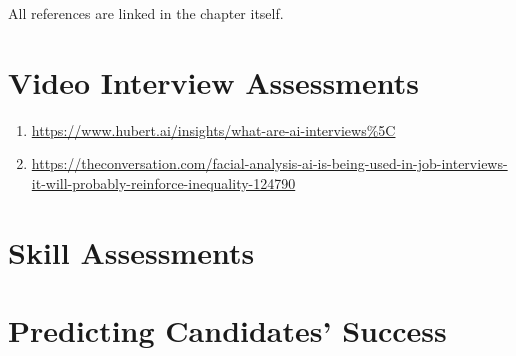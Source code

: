 \documentclass[
]{book}
\begin{document}
All references are linked in the chapter itself.

\hypertarget{video-interview-assessments-1}{%
\section{Video Interview Assessments}\label{video-interview-assessments-1}}

\begin{enumerate}
\def\labelenumi{(\arabic{enumi})}
\item
  \url{https://www.hubert.ai/insights/what-are-ai-interviews\%5C}
\item
  \url{https://theconversation.com/facial-analysis-ai-is-being-used-in-job-interviews-it-will-probably-reinforce-inequality-124790}
\end{enumerate}

\hypertarget{skill-assessments-1}{%
\section{Skill Assessments}\label{skill-assessments-1}}

\hypertarget{predicting-candidates-success-1}{%
\section{Predicting Candidates' Success}\label{predicting-candidates-success-1}}

  
\end{document}
